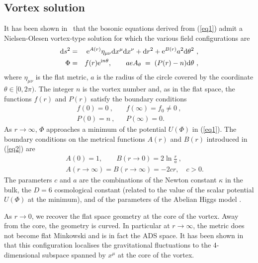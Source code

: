 \documentclass[a4paper,12pt]{article}
\begin{document}
\subsection{Vortex solution}
It has been shown in~\cite{Giovannini:2001hh} that the bosonic
equations derived from (\ref{eq1}) admit a Nielsen-Olesen vortex-type
solution for which the various field configurations are
\begin{eqnarray}
{\rm d}s^2&=&{\rm e}^{A(r)}\eta_{\mu\nu}{\rm d}x^\mu{\rm d}x^\nu
+{\rm d}r^2+{\rm e}^{B(r)}a^2{\rm d}\theta^2~,
\label{eq2}\\ 
\nonumber
\Phi &=&
f(r){\rm e}^{{\rm i}n\theta},\qquad aeA_\theta\;=\;(P(r)-n){\rm
d}\theta~,
\end{eqnarray}
where $\eta_{\mu\nu}$ is the flat metric, $a$ is the radius of the
circle covered by the coordinate $\theta\in[0,2\pi)$. The integer $n$
is the vortex number and, as in the flat space, the functions $f(r)$
and $P(r)$ satisfy the boundary conditions
\begin{eqnarray}
f(0) =0~, && f(\infty)=f_0\neq 0~,\\
\nonumber
P(0)=n~, &&P(\infty )= 0.
\end{eqnarray}
As $r\to\infty$, $\Phi$ approaches a minimum of the potential
$U(\Phi)$ in (\ref{eq1}). The boundary conditions on the metrical
functions $A(r)$ and $B(r)$ introduced in (\ref{eq2}) are
\begin{eqnarray}
&&A(0)=1,\qquad B(r\to 0)=2\ln\frac{r}{a}~,\\
\nonumber
&&A(r \to \infty)=B(r \to \infty)=-2cr,\quad c>0.
\label{c}
\end{eqnarray}
The parameters $c$ and $a$ are the combinations of the Newton
constant $\kappa$  in the bulk,  the $D=6$ cosmological constant
(related to the value of the scalar potential $U(\Phi)$ at the
minimum), and of the parameters of the Abelian Higgs model
\cite{Gherghetta:2000qi,Giovannini:2001hh}. 

As $r\to 0$, we recover the flat space geometry at the core of the
vortex. Away from the core, the geometry is curved. In particular at
$r \to\infty$, the metric does not  become flat Minkowski and is in
fact the ADS space. It has been shown
in~\cite{Gherghetta:2000qi,Giovannini:2001hh} that this configuration
localises the gravitational fluctuations to the 4-dimensional
subspace spanned by $x^\mu$ at the core of the vortex.
\end{document}
